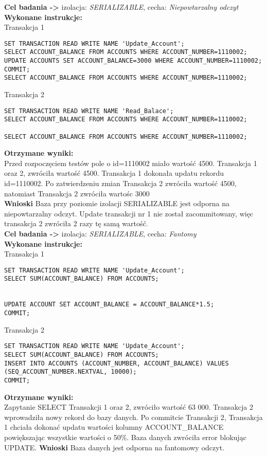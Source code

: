\documentclass[11pt,oneside, a4paper]{article}
\begin{document}
\textbf{Cel badania ->} izolacja:
\textit{SERIALIZABLE}, cecha:
\textit{Niepowtarzalny odczyt} \\
\textbf{Wykonane instrukcje: } \\
Transakcja 1
\begin{lstlisting}
SET TRANSACTION READ WRITE NAME 'Update_Account';
SELECT ACCOUNT_BALANCE FROM ACCOUNTS WHERE ACCOUNT_NUMBER=1110002;
UPDATE ACCOUNTS SET ACCOUNT_BALANCE=3000 WHERE ACCOUNT_NUMBER=1110002;
COMMIT;
SELECT ACCOUNT_BALANCE FROM ACCOUNTS WHERE ACCOUNT_NUMBER=1110002;
\end{lstlisting}
Transakcja 2
\begin{lstlisting}
SET TRANSACTION READ WRITE NAME 'Read_Balace';
SELECT ACCOUNT_BALANCE FROM ACCOUNTS WHERE ACCOUNT_NUMBER=1110002;

SELECT ACCOUNT_BALANCE FROM ACCOUNTS WHERE ACCOUNT_NUMBER=1110002;
\end{lstlisting}
\textbf{Otrzymane wyniki:} \\
    Przed rozpoczęciem testów pole o id=1110002 miało wartość 4500. Transakcja 1 oraz 2, zwróciła  wartość 4500. Transakcja 1 dokonała updatu rekordu id=1110002. Po zatwierdzeniu zmian Transakcja 2 zwróciła wartość 4500, natomiast Transakcja 2 zwróciła wartośc 3000\\
\textbf{Wnioski } Baza przy poziomie izolacji SERIALIZABLE jest odporna na niepowtarzalny odczyt. Update transakcji nr 1 nie został zacommitowany, więc transakcja 2 zwróciła 2 razy tę samą wartość.\\

\textbf{Cel badania ->} izolacja:
\textit{SERIALIZABLE}, cecha:
\textit{Fantomy} \\
\textbf{Wykonane instrukcje: } \\
Transakcja 1
\begin{lstlisting}
SET TRANSACTION READ WRITE NAME 'Update_Account';
SELECT SUM(ACCOUNT_BALANCE) FROM ACCOUNTS;


UPDATE ACCOUNT SET ACCOUNT_BALANCE = ACCOUNT_BALANCE*1.5;
COMMIT;
\end{lstlisting}
Transakcja 2
\begin{lstlisting}
SET TRANSACTION READ WRITE NAME 'Update_Account';
SELECT SUM(ACCOUNT_BALANCE) FROM ACCOUNTS;
INSERT INTO ACCOUNTS (ACCOUNT_NUMBER, ACCOUNT_BALANCE) VALUES (SEQ_ACCOUNT_NUMBER.NEXTVAL, 10000);
COMMIT;
\end{lstlisting}
\textbf{Otrzymane wyniki:} \\
    Zapytanie SELECT Transakcji 1 oraz 2, zwróciło  wartość 63 000. Transakcja 2 wprowadziła nowy rekord do bazy danych. Po commitcie Transakcji 2, Transakcja 1 chciała dokonać updatu wartości kolumny ACCOUNT\_BALANCE powiększając wszystkie wartości o 50\%. Baza danych zwróciła error blokując UPDATE.
\textbf{Wnioski } Baza danych jest odporna na fantomowy odczyt.
\end{document}
